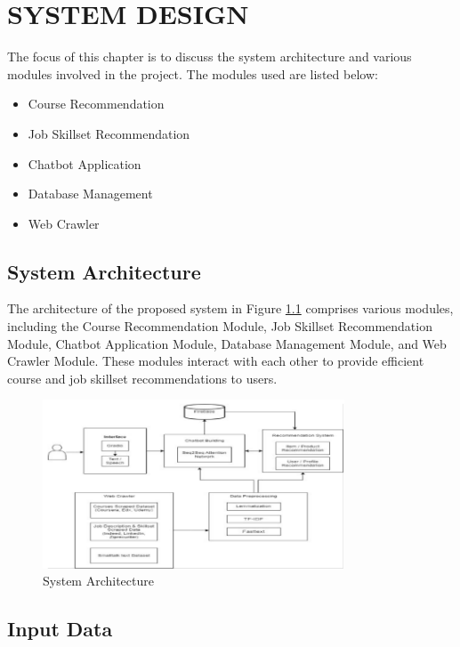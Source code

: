 \chapter{\uppercase{System Design}} %
\label{ch:chap3} %

The focus of this chapter is to discuss the system architecture and various modules involved in the project. The modules used are listed below:

\begin{itemize}
    \item Course Recommendation
    \item Job Skillset Recommendation
    \item Chatbot Application
    \item Database Management
    \item Web Crawler
\end{itemize}

\section{System Architecture}
The architecture of the proposed system in Figure \ref{fig:system_architecture} comprises various modules, including the Course Recommendation Module, Job Skillset Recommendation Module, Chatbot Application Module, Database Management Module, and Web Crawler Module. These modules interact with each other to provide efficient course and job skillset recommendations to users.

\begin{figure}[h]
\centering
\includegraphics[width=0.8\textwidth]{3/system.png}
\caption{System Architecture}
\label{fig:system_architecture}
\end{figure}

\section{Input Data}

